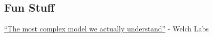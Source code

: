 \documentclass{article}
\newenvironment{envsection}[1]{\begin{trivlist}
\item[\hskip \labelsep {\bfseries #1}]}{\end{trivlist}}
\begin{document}
\subsection*{Fun Stuff}

\begin{envsection}{1. Watch:}
    \href{https://www.youtube.com/watch?v=D8GOeCFFby4&t=1593s}{``The most complex model we actually understand''} - Welch Labs
\end{envsection}
\end{document}
